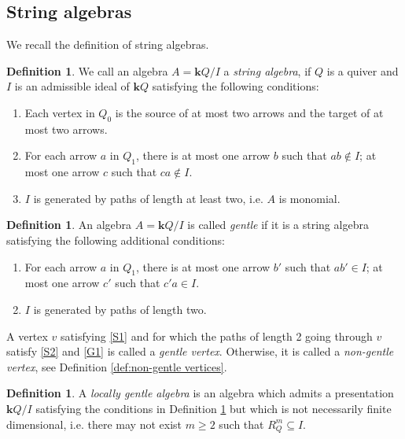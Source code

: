 \documentclass[11pt]{amsart}
\numberwithin{equation}{section}
\theoremstyle{definition}
\newtheorem{definition}[theorem]{Definition}
\begin{document}
\subsection{String algebras}
We recall the definition of string algebras. 
\begin{definition}\cite{BR87}\label{definition:string algebras}
	We call an algebra $A=\mathbf{k}Q/I$ a \emph{string algebra}, if $Q$ is a quiver and $I$ is an admissible ideal of $\mathbf{k}Q$ satisfying the following conditions:
	\begin{enumerate}[label=(\arabic*), label={(S\arabic*)}]
		\item Each vertex in $Q_0$ is the source of at most two arrows and the target of at most two arrows.\label{S1}
		
		\item For each arrow $a$ in $Q_1$, there is at most one arrow $b$ such that  $ab\notin I$; at most one arrow $c$ such that  $ ca\notin I$.\label{S2} 
		
		\item $I$ is generated by paths of length at least two, i.e. $A$ is monomial. \label{S3}
	\end{enumerate}
\end{definition}

\begin{definition}\label{definition:gentle algebras}
	An algebra $A = \mathbf{k}Q/I$ is called \emph{gentle} if it is a string algebra satisfying the following additional conditions:
	\begin{enumerate}[label=(\arabic*), label={(G\arabic*)}]
		\item For each arrow $a$ in $Q_1$, there is at most one arrow $b'$ such that $ab'\in I$; at most one arrow $c'$ such that $c'a\in I$. \label{G1}
		
		\item $I$ is generated by paths of length two.\label{G2}
	\end{enumerate}
\end{definition}

A vertex $v$ satisfying \ref{S1} and for which the paths of length 2 going through $v$ satisfy
\ref{S2} and \ref{G1} is called a \emph{gentle vertex}. Otherwise, it is called a \emph{non-gentle vertex}, see Definition \ref{def:non-gentle vertices}.

\begin{definition}\label{definition:locally gentle algebras}
	A \emph{locally gentle algebra} is an algebra which admits a presentation $\mathbf{k}Q/I$ satisfying the conditions in Definition \ref{definition:gentle algebras} but which is not necessarily finite dimensional, i.e. there may not exist \( m \geq 2 \) such that \( R_Q^m \subseteq I\).
\end{definition}
\end{document}
